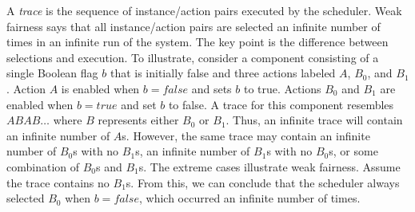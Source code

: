 A \emph{trace} is the sequence of instance/action pairs executed by the scheduler.
Weak fairness says that all instance/action pairs are selected an infinite number of times in an infinite run of the system.
The key point is the difference between selections and execution.
To illustrate, consider a component consisting of a single Boolean flag $b$ that is initially false and three actions labeled $A$, $B_0$, and $B_1$.
Action $A$ is enabled when $b = false$ and sets $b$ to true.
Actions $B_0$ and $B_1$ are enabled when $b = true$ and set $b$ to false.
A trace for this component resembles $ABAB \ldots$ where $B$ represents either $B_0$ or $B_1$.
Thus, an infinite trace will contain an infinite number of $A$s.
However, the same trace may contain an infinite number of $B_0$s with no $B_1$s, an infinite number of $B_1$s with no $B_0$s, or some combination of $B_0$s and $B_1$s.
The extreme cases illustrate weak fairness.
Assume the trace contains no $B_1$s.
From this, we can conclude that the scheduler always selected $B_0$ when $b = false$, which occurred an infinite number of times.

